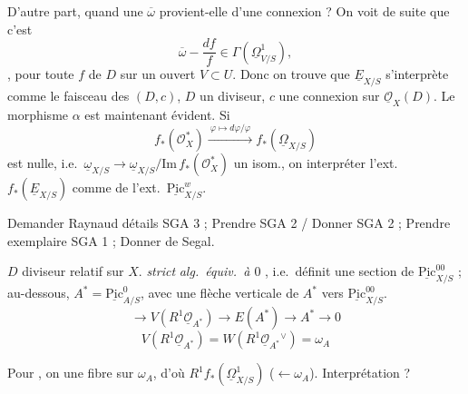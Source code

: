 \documentclass[11pt,a4paper]{article}
\begin{document}
\struck{\ill{}} D'autre part, quand une $\overline{\omega}$ provient-elle d'une connexion ? On voit de suite que c'est 
\[
  \overline{\omega} - \frac{df}{f} \in \Gamma(\underline{\Omega}^1_{V/S}),
\]
, pour toute   $f$ de $D$ sur un ouvert $V \subset U$. Donc on trouve que $\underline{E}_{X/S}$ s'interprète comme le faisceau des $(D, c)$, $D$ un diviseur, $c$ une connexion sur $\underline{\mathcal{O}}_X(D)$. Le morphisme $\alpha$ est maintenant évident. Si
\[
  f_*(\mathcal{O}_X^*) \xrightarrow{\ \varphi \mapsto d\varphi/\varphi\ } f_*(\underline{\Omega}_{X/S})
\]
est nulle, i.e.\ $\underline{\omega}_{X/S} \to \underline{\omega}_{X/S}/\mathrm{Im}\, f_*(\mathcal{O}_X^*)$ un isom., on   interpréter l'ext.\ $f_*(\underline{E}_{X/S})$ comme \ill{} de l'ext.\ $\underline{\mathrm{Pic}}^{w}_{X/S}$.

Demander Raynaud détails  SGA 3 ; Prendre SGA 2 / Donner SGA 2 ; Prendre exemplaire \ill{} SGA 1 ; Donner \ill{}  de Segal.



$D$ diviseur relatif sur $X$. \emph{strict} \emph{alg.\ équiv.\ à $0$} , i.e.\ définit une section de  $\underline{\mathrm{Pic}}^{00}_{X/S}$ ; au-dessous, $A^* = \underline{\mathrm{Pic}}^{0}_{A/S}$, avec une flèche verticale de $A^*$ vers $\underline{\mathrm{Pic}}^{00}_{X/S}$.
\[
  \longrightarrow V(R^1\underline{\mathcal{O}}_{A^*}) \longrightarrow E(A^*) \longrightarrow A^* \longrightarrow 0
\]
\[
  V(R^1\underline{\mathcal{O}}_{A^*}) = W(R^1\underline{\mathcal{O}}_{A^*}{}^{\vee}) = \omega_A
\]

Pour  \ill{}, on  une fibre  sur $\omega_A$, d'où \ill{}  $R^1f_*(\underline{\Omega}^1_{X/S})$ ($\longleftarrow \omega_A$). Interprétation ?
\end{document}
